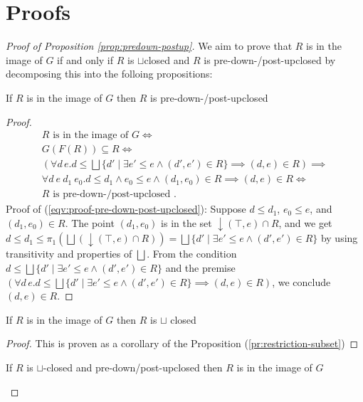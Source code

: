 \documentclass{llncs}
\newcommand{\join}{\sqcup}
\newcommand{\bigjoin}{\bigsqcup}
\begin{document}
\section{Proofs}
\begin{proof}[Proof of Proposition \ref{prop:predown-postup}]
  We aim to prove that $R$ is in the image of $G$ if and only if $R$ is $\join$closed and $R$ is pre-down-/post-upclosed by decomposing this into the folloing propositions:
  \begin{proposition}
     If $R$ is in the image of $G$ then $R$ is pre-down-/post-upclosed
     \begin{proof}
    \begin{align*}
      R \text{ is in the image of } G \iff \\
      G(F(R)) \subseteq R \iff \\
      (\forall d\, e . d \leq \bigjoin \{ d' \mid \exists e' \leq e \land (d', e') \in R \} \implies (d , e) \in R) \implies \tag{\theequation}\label{eqv:proof-pre-down-post-upclosed} \\
      \forall d\ e\ d_{1 }\ e_{0}. d \leq d_{1} \land e_{0} \leq e \land (d_{1}, e_{0}) \in R \implies (d, e) \in R \iff \\
      R \text{ is pre-down-/post-upclosed }.
    \end{align*}
    Proof of (\ref{eqv:proof-pre-down-post-upclosed}):
    Suppose $d \leq d_{1}$, $e_{0} \leq e$, and $(d_{1} , e_{0}) \in R$.
    The point $(d_{1} , e_{0})$ is in the set $\downarrow (\top , e) \cap R$, and we get
    $d \leq d_{1}  \leq \pi_{1} (\bigjoin (\downarrow (\top , e) \cap R)) = \bigjoin \{ d' \mid \exists e' \leq e \land (d', e') \in R \}$
    by using transitivity and properties of $\bigjoin$.
    From the condition $d \leq \bigjoin \{ d' \mid \exists e' \leq e \land (d', e') \in R \}$ and the premise $(\forall d\, e . d \leq \bigjoin \{ d' \mid \exists e' \leq e \land (d', e') \in R \} \implies (d , e) \in R)$, we conclude $(d , e) \in R$.
     \end{proof}
  \end{proposition}
  \begin{proposition}
    If $R$ is in the image of $G$ then $R$ is $\join$ closed
    \begin{proof}
    This is proven as a corollary of the Proposition (\ref{pr:restriction-subset})
    \end{proof}
  \end{proposition}
  \begin{proposition}
    If $R$ is $\join$-closed and pre-down/post-upclosed then $R$ is in the image of $G$

\end{proposition}
\end{proof}
\end{document}
